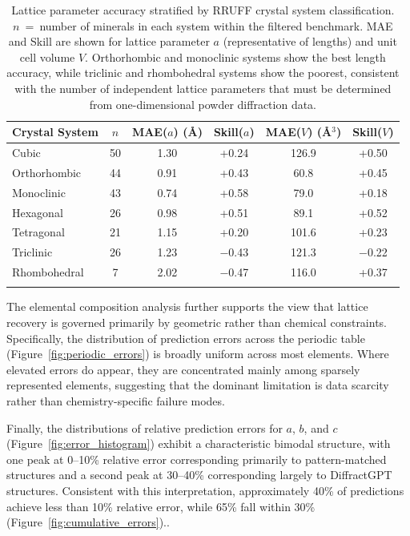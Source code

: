 \documentclass[pdflatex,sn-mathphys-num]{sn-jnl}
\theoremstyle{thmstyleone}
\theoremstyle{thmstyletwo}
\theoremstyle{thmstylethree}
\begin{document}
\begin{table}[h]
\caption{Lattice parameter accuracy stratified by RRUFF crystal system classification. $n$~=~number of minerals in each system within the filtered benchmark. MAE and Skill are shown for lattice parameter $a$ (representative of lengths) and unit cell volume $V$. Orthorhombic and monoclinic systems show the best length accuracy, while triclinic and rhombohedral systems show the poorest, consistent with the number of independent lattice parameters that must be determined from one-dimensional powder diffraction data.}\label{tab:crystal_system}
\begin{tabular}{@{}lccccc@{}}
\toprule
Crystal System & $n$ & MAE($a$) (\AA) & Skill($a$) & MAE($V$) (\AA$^3$) & Skill($V$) \\
\midrule
Cubic & 50 & 1.30 & +0.24 & 126.9 & +0.50 \\
Orthorhombic & 44 & 0.91 & +0.43 & 60.8 & +0.45 \\
Monoclinic & 43 & 0.74 & +0.58 & 79.0 & +0.18 \\
Hexagonal & 26 & 0.98 & +0.51 & 89.1 & +0.52 \\
Tetragonal & 21 & 1.15 & +0.20 & 101.6 & +0.23 \\
Triclinic & 26 & 1.23 & $-$0.43 & 121.3 & $-$0.22 \\
Rhombohedral & 7 & 2.02 & $-$0.47 & 116.0 & +0.37 \\
\botrule
\end{tabular}
\end{table}

The elemental composition analysis further supports the view that lattice recovery is governed primarily by geometric rather than chemical constraints. Specifically, the distribution of prediction errors across the periodic table (Figure~\ref{fig:periodic_errors}) is broadly uniform across most elements. Where elevated errors do appear, they are concentrated mainly among sparsely represented elements, suggesting that the dominant limitation is data scarcity rather than chemistry-specific failure modes.

Finally, the distributions of relative prediction errors for $a$, $b$, and $c$ (Figure~\ref{fig:error_histogram}) exhibit a characteristic bimodal structure, with one peak at 0--10\% relative error corresponding primarily to pattern-matched structures and a second peak at 30--40\% corresponding largely to DiffractGPT structures. Consistent with this interpretation, approximately 40\% of predictions achieve less than 10\% relative error, while 65\% fall within 30\% (Figure~\ref{fig:cumulative_errors})..
\end{document}
